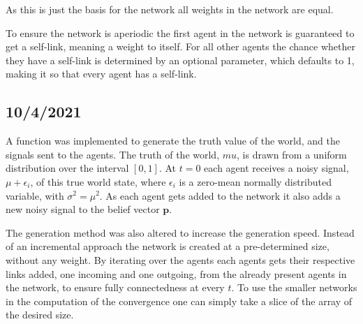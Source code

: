 \documentclass{article}
\begin{document}
As this is just the basis for the network all weights in the network are equal.

To ensure the network is aperiodic the first agent in the network is guaranteed to get a self-link, meaning a weight to itself. For all other agents the chance whether they have a self-link is determined by an optional parameter, which defaults to 1, making it so that every agent has a self-link.

\newpage

\subsection{10/4/2021}
A function was implemented to generate the truth value of the world, and the signals sent to the agents.
The truth of the world, $mu$, is drawn from a uniform distribution over the interval $[0, 1]$. At $t=0$ each agent receives a noisy signal, $\mu + \epsilon_i$, of this true world state, where $\epsilon_i$ is a zero-mean normally distributed variable, with $\sigma^2 = \mu^2$. As each agent gets added to the network it also adds a new noisy signal to the belief vector $\textbf{p}$.

The generation method was also altered to increase the generation speed. Instead of an incremental approach the network is created at a pre-determined size, without any weight. By iterating over the agents each agents gets their respective links added, one incoming and one outgoing, from the already present agents in the network, to ensure fully connectedness at every $t$. To use the smaller networks in the computation of the convergence one can simply take a slice of the array of the desired size.
\end{document}
